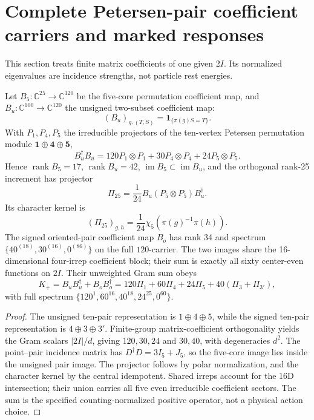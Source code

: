 \documentclass[12pt,a4paper]{article}
\begin{document}
\section{Complete Petersen-pair coefficient carriers and marked responses}
\label{p6:sec:v338-pair-incidence}
This section treats finite matrix coefficients of one given $2I$.
Its normalized eigenvalues are incidence strengths, not particle
rest energies.

\begin{theorem}
\label{p6:thm:v338-pair-incidence-full-rank}
Let $B_5:\mathbb C^{25}\to\mathbb C^{120}$ be the five-core
permutation coefficient map, and $B_u:\mathbb C^{100}\to
\mathbb C^{120}$ the unsigned two-subset coefficient map:
\[(B_u)_{g,(T,S)}=\mathbf1_{\{\pi(g)S=T\}}.\]
With $P_1,P_4,P_5$ the irreducible projectors of the ten-vertex
Petersen permutation module $\mathbf1\oplus\mathbf4\oplus\mathbf5$,
\[
 B_u^\dagger B_u=120P_1\otimes P_1
              +30P_4\otimes P_4+24P_5\otimes P_5.
\]
Hence $\operatorname{rank}B_5=17$, $\operatorname{rank}B_u=42$,
$\operatorname{im}B_5\subset\operatorname{im}B_u$, and the
orthogonal rank-25 increment has projector
\[
 \Pi_{25}=\frac1{24}B_u(P_5\otimes P_5)B_u^\dagger.
\]
Its character kernel is
\[
 (\Pi_{25})_{g,h}=\frac1{24}\chi_5(\pi(g)^{-1}\pi(h)).
\]
The signed oriented-pair coefficient map $B_o$ has rank 34 and
spectrum $\{40^{(18)},30^{(16)},0^{(86)}\}$ on the full
$120$-carrier.  The two images share the 16-dimensional
four-irrep coefficient block; their sum is exactly all sixty
center-even functions on $2I$.  Their unweighted Gram sum obeys
\[
 K_+=B_uB_u^\dagger+B_oB_o^\dagger
 =120\Pi_1+60\Pi_4+24\Pi_5+40(\Pi_3+\Pi_{3'}),
\]
with full spectrum $\{120^1,60^{16},40^{18},24^{25},0^{60}\}$.
\end{theorem}
\begin{proof}
The unsigned ten-pair representation is $1\oplus4\oplus5$,
while the signed ten-pair representation is $4\oplus3\oplus3'$.
Finite-group matrix-coefficient orthogonality yields the Gram
scalars $|2I|/d$, giving $120,30,24$ and $30,40$, with
degeneracies $d^2$.  The point--pair incidence matrix has
$D^\dagger D=3I_5+J_5$, so the five-core image lies inside
the unsigned pair image.  The projector follows by polar
normalization, and the character kernel by the central idempotent.
Shared irreps account for the 16D intersection; their union carries
all five even irreducible coefficient sectors.  The sum is the
specified counting-normalized positive operator, not a physical
action choice.
\end{proof}
\end{document}

